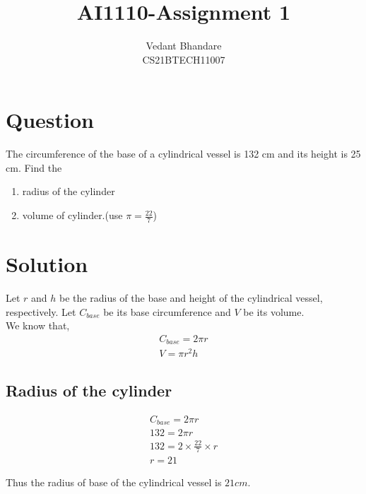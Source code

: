 \documentclass[journal,12pt,twocolumn]{IEEEtran}
\begin{document}
\raggedbottom
\setlength{\parindent}{0pt}
\vspace{3cm}
\title{AI1110-Assignment 1}
\author{Vedant Bhandare\\CS21BTECH11007}
\maketitle
\newpage
\bigskip
\renewcommand{\thefigure}{\theenumi}
\renewcommand{\thetable}{\theenumi}

\section{\textbf{Question}}
The circumference of the base of a cylindrical vessel is 132 cm and its height is 25 cm. Find the

\begin{enumerate}
    \item radius of the cylinder
    \item volume of cylinder.(use $\pi = \frac{22}{7}$)
\end{enumerate}
\section{\textbf{Solution}}
Let $r$ and $h$ be the radius of the base and height of the cylindrical vessel, respectively.
Let $C_{base}$ be its base circumference and $V$ be its volume.\\

We know that,
\begin{align}
    C_{base} = 2\pi{r}\\
    V = \pi{r^2h}
\end{align}

\subsection{\textbf{Radius of the cylinder}}
\begin{align}
C_{base} = 2\pi{r}\\
132 = 2\pi{r}\\
132 = 2\times\frac{22}{7}\times{r}\\
r = 21
\end{align}
\begin{center}
    Thus the radius of base of the cylindrical vessel is $21 cm$.
\end{center}
\end{document}
